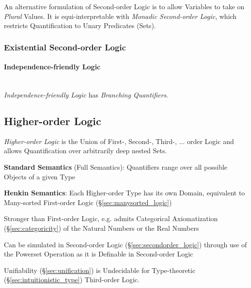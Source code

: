 An alternative formulation of Second-order Logic is to allow Variables
to take on \emph{Plural} Values. It is equi-interpretable with
\emph{Monadic Second-order Logic}, which restricts Quantification to
Unary Predicates (Sets).



\subsubsection{Existential Second-order Logic}
\label{sec:existential_secondorder}

\paragraph{Independence-friendly\hfill
  Logic}\label{sec:independence_logic}\hfill \\

\emph{Independence-friendly Logic} has \emph{Branching Quantifiers}.



\subsection{Higher-order Logic}\label{sec:higherorder_logic}

\emph{Higher-order Logic} is the Union of First-, Second-, Third-,
$\ldots$ order Logic and allows Quantification over arbitrarily deep
nested Sets.

\textbf{Standard Semantics} (Full Semantics): Quantifiers range over all
possible Objects of a given Type

\textbf{Henkin Semantics}: Each Higher-order Type has its own Domain,
equivalent to Many-sorted First-order Logic
(\S\ref{sec:manysorted_logic})

Stronger than First-order Logic, e.g. admits Categorical
Axiomatization (\S\ref{sec:categoricity}) of the Natural Numbers or
the Real Numbers

Can be simulated in Second-order Logic (\S\ref{sec:secondorder_logic})
through use of the Powerset Operation as it is Definable in
Second-order Logic

Unifiability (\S\ref{sec:unification}) is Undecidable for
Type-theoretic (\S\ref{sec:intuitionistic_type}) Third-order Logic.



